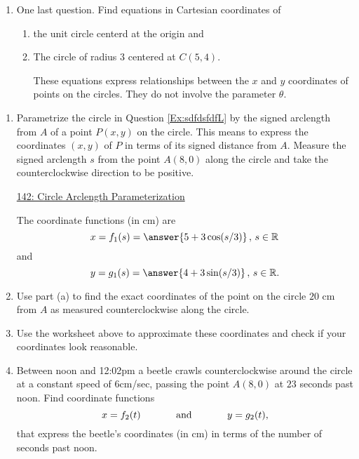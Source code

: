\documentclass{ximera}
\begin{document}
\begin{question}
\begin{explanation}
\begin{enumerate}
\item One last question. Find equations in Cartesian coordinates of 

\begin{enumerate}
\item the unit circle centerd at the origin and 

\item The circle of radius $3$ centered at  $C(5,4)$.

These equations express relationships between the $x$ and $y$ coordinates of points on the circles. They do not involve the parameter $\theta$. 

\end{enumerate}
\end{enumerate}

\end{explanation}
\end{question}


\begin{question}  \label{QDF09dfdfLKDD}
\begin{enumerate}

\item Parametrize the circle in Question \ref{Ex:sdfdsfdfL} by the signed arclength from $A$ of a point $P(x,y)$ on the circle. This means to express the coordinates $(x,y)$ of $P$ in terms of its signed distance from $A$. Measure the signed arclength $s$ from the point $A(8,0)$ along the circle and take the counterclockwise direction to be positive. 

\begin{onlineOnly}
    \begin{center}
\end{center}
\end{onlineOnly}

\href{https://www.desmos.com/calculator/llrzcv5ckf}{142: Circle Arclength Parameterization}



The coordinate functions (in cm) are 
\[
  x = f_1(s) = \answer{5 + 3 \cos(s/3)} \, , \, s\in \mathbb{R}
\]
and
\[
   y = g_1(s) = \answer{4 + 3 \sin(s/3)} \, , \, s\in \mathbb{R} .
\]

\item Use part (a) to find the exact coordinates of the point on the circle  $20$ cm from $A$ as measured counterclockwise along the circle. 

\item Use the worksheet above to approximate these coordinates and check if your coordinates look reasonable.

\item Between noon and 12:02pm a beetle crawls counterclockwise around the circle at a constant speed of $6$cm/sec, passing the point $A(8,0)$ at $23$ seconds past noon. Find coordinate functions
\[
   x = f_2(t)  \hskip 0.5 in \text{and} \hskip 0.5in  y=g_2(t) ,
\] 
that express the beetle's coordinates (in cm) in terms of the number of seconds past noon.

\end{enumerate}
\end{question}
\end{document}
